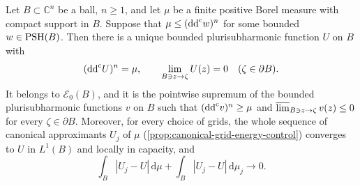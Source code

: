 \begin{theorem}\label{thm:compact-bounded-subsolution-ball-dirichlet}
Let $B\subset\mathbb C^n$ be a ball, $n\geq1$, and let $\mu$ be a finite positive Borel measure with compact support in $B$. Suppose that $\mu\leq(\mathrm{dd}^{\mathrm{c}} w)^n$ for some bounded $w\in\mathrm{PSH}(B)$. Then there is a unique bounded plurisubharmonic function $U$ on $B$ with
\[
 (\mathrm{dd}^{\mathrm{c}} U)^n=\mu,\qquad
 \lim_{B\ni z\to\zeta}U(z)=0\quad(\zeta\in\partial B).
\]
It belongs to $\mathcal E_0(B)$, and it is the pointwise supremum of the bounded plurisubharmonic functions $v$ on $B$ such that $(\mathrm{dd}^{\mathrm{c}} v)^n\geq\mu$ and $\varlimsup_{B\ni z\to\zeta}v(z)\leq0$ for every $\zeta\in\partial B$. Moreover, for every choice of grids, the whole sequence of canonical approximants $U_j$ of $\mu$ (\cref{prop:canonical-grid-energy-control}) converges to $U$ in $L^1(B)$ and locally in capacity, and
\[
 \int_B|U_j-U|\,\mathrm d\mu
       +\int_B|U_j-U|\,\mathrm d\mu_j\longrightarrow0.
\]
\end{theorem}
